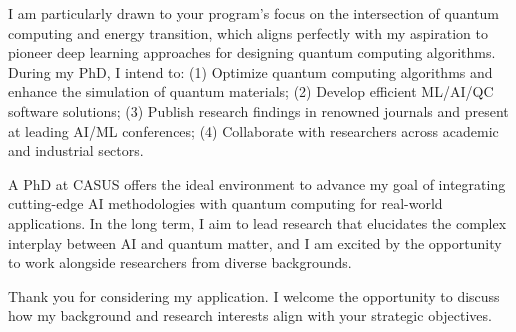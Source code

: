 \documentclass[11pt,a4paper,roman]{moderncv}
\begin{document}
I am particularly drawn to your program's focus on the intersection of quantum computing and energy transition, which aligns perfectly with my aspiration to pioneer deep learning approaches for designing quantum computing algorithms. 
During my PhD, I intend to: 
(1) Optimize quantum computing algorithms and enhance the simulation of quantum materials; 
(2) Develop efficient ML/AI/QC software solutions; 
(3) Publish research findings in renowned journals and present at leading AI/ML conferences; 
(4) Collaborate with researchers across academic and industrial sectors.

A PhD at CASUS offers the ideal environment to advance my goal of integrating cutting-edge AI methodologies with quantum computing for real-world applications. 
In the long term, I aim to lead research that elucidates the complex interplay between AI and quantum matter, and I am excited by the opportunity to work alongside researchers from diverse backgrounds.

Thank you for considering my application. I welcome the opportunity to discuss how my background and research interests align with your strategic objectives.

\makeletterclosing
\end{document}

